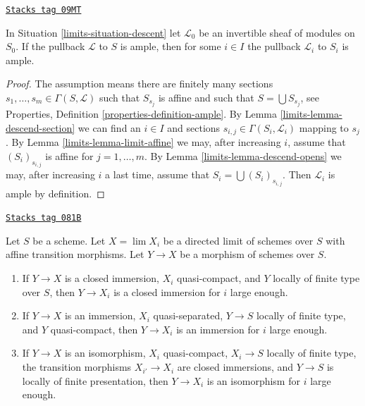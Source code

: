 \begin{lemma}
\label{limits-lemma-limit-ample}
\href{https://stacks.math.columbia.edu/tag/09MT}{\texttt{Stacks tag 09MT}}

In Situation \ref{limits-situation-descent} let $\mathcal{L}_0$ be an invertible
sheaf of modules on $S_0$. If the pullback $\mathcal{L}$ to $S$ is ample,
then for some $i \in I$ the pullback $\mathcal{L}_i$ to $S_i$ is ample.
\end{lemma}

\begin{proof}

The assumption means there are finitely many sections
$s_1, \ldots, s_m \in \Gamma(S, \mathcal{L})$ such that
$S_{s_j}$ is affine and such that $S = \bigcup S_{s_j}$, see
Properties, Definition \ref{properties-definition-ample}.
By Lemma \ref{limits-lemma-descend-section} we can find an $i \in I$
and sections $s_{i, j} \in \Gamma(S_i, \mathcal{L}_i)$ mapping to $s_j$.
By Lemma \ref{limits-lemma-limit-affine} we may, after increasing $i$, assume
that $(S_i)_{s_{i, j}}$ is affine for $j = 1, \ldots, m$.
By Lemma \ref{limits-lemma-descend-opens} we may, after increasing $i$ a
last time, assume that $S_i = \bigcup (S_i)_{s_{i, j}}$.
Then $\mathcal{L}_i$ is ample by definition.
\end{proof}

\begin{lemma}
\label{limits-lemma-finite-type-eventually-closed}
\href{https://stacks.math.columbia.edu/tag/081B}{\texttt{Stacks tag 081B}}

Let $S$ be a scheme. Let $X = \lim X_i$ be a directed limit of
schemes over $S$ with affine transition morphisms. Let $Y \to X$
be a morphism of schemes over $S$.
\begin{enumerate}
\item If $Y \to X$ is a closed immersion, $X_i$ quasi-compact, and
$Y$ locally of finite type over $S$, then $Y \to X_i$ is a closed
immersion for $i$ large enough.
\item If $Y \to X$ is an immersion, $X_i$ quasi-separated, $Y \to S$ locally
of finite type, and $Y$ quasi-compact, then $Y \to X_i$ is an
immersion for $i$ large enough.
\item If $Y \to X$ is an isomorphism, $X_i$ quasi-compact,
$X_i \to S$ locally of finite type, the transition morphisms
$X_{i'} \to X_i$ are closed immersions, and $Y \to S$ is locally
of finite presentation, then $Y \to X_i$ is an isomorphism for $i$
large enough.
\end{enumerate}
\end{lemma}

